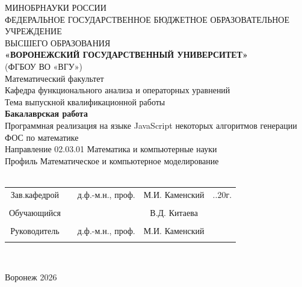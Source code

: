 \begin{center}
	\hfill \break
	\large{МИНОБРНАУКИ РОССИИ}\\
	\hfill \break
	\footnotesize{ФЕДЕРАЛЬНОЕ ГОСУДАРСТВЕННОЕ БЮДЖЕТНОЕ ОБРАЗОВАТЕЛЬНОЕ УЧРЕЖДЕНИЕ}\\
	\footnotesize{ВЫСШЕГО ОБРАЗОВАНИЯ}\\
	\hfill \break
	\small{\textbf{«ВОРОНЕЖСКИЙ ГОСУДАРСТВЕННЫЙ УНИВЕРСИТЕТ»}}\\
	\small{(ФГБОУ ВО «ВГУ»)}\\
	\hfill \break
	\normalsize{Математический факультет}\\
	\hfill \break
	\normalsize{Кафедра функционального анализа и операторных уравнений}\\
	\hfill\break
	\hfill \break
	\hfill \break
	\hfill \break
	\normalsize{Тема выпускной квалификационной работы}\\
	\hfill \break
	\large{\textbf{Бакалаврская работа}}\\
	\hfill \break
	\large{Программная реализация на языке JavaScript некоторых алгоритмов генерации ФОС по математике}\\
	\hfill \break
	\hfill \break
	\normalsize{Направление 02.03.01 Математика и компьютерные науки\\
		\hfill \break
		Профиль Математическое и компьютерное моделирование\\
		\hfill \break
	}\\
	\hfill \break
	\hfill \break
\end{center}
\hfill \break

\normalsize{
	\begin{tabular}{ccccc}
		Зав.кафедрой & \underline{\hspace{2.5cm}} & д.ф.-м.н., проф. & М.И. Каменский & \underline{\hspace{0.5cm}}.\underline{\hspace{0.5cm}}.20\underline{\hspace{0.5cm}}г. \\\\
		Обучающийся  & \underline{\hspace{2.5cm}} &                  & В.Д. Китаева   & \\\\
		Руководитель & \underline{\hspace{2.5cm}} & д.ф.-м.н., проф. & М.И. Каменский & \\\\
	\end{tabular}
}\\
\hfill \break
\hfill \break
\begin{center} Воронеж 2026 \end{center}
\thispagestyle{empty} %
